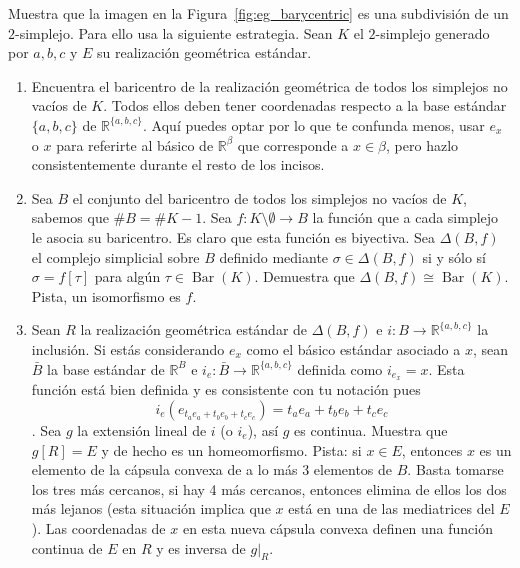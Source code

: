 \documentclass{standalone}
\begin{document}
	\begin{exercise}
		Muestra que la imagen en la Figura~\ref{fig:eg_barycentric} es una subdivisión de un $2$-simplejo. Para ello usa la siguiente estrategia. Sean $K$ el $2$-simplejo generado por ${a,b,c}$ y $E$ su realización geométrica estándar.
		
		\begin{enumerate}
			\item Encuentra el baricentro de la realización geométrica de todos los simplejos no vacíos de $K$. Todos ellos deben tener coordenadas respecto a la base estándar $\{a,b,c\}$ de $\mathbb{R}^{\{a,b,c\}}$. Aquí puedes optar por lo que te confunda menos, usar $e_{x}$ o $x$ para referirte al básico de $\mathbb{R}^{\beta}$ que corresponde a $x\in\beta$, pero hazlo consistentemente durante el resto de los incisos.
			
			\item Sea $B$ el conjunto del baricentro de todos los simplejos no vacíos de $K$, sabemos que $\#B = \#K -1$. Sea $f\colon K\setminus\emptyset \rightarrow B$ la función que a cada simplejo le asocia su baricentro. Es claro que esta función es biyectiva. Sea $\Delta(B,f)$ el complejo simplicial sobre $B$ definido mediante $\sigma\in\Delta(B,f)$ si y sólo sí $\sigma = f[\tau]$ para algún $\tau\in\operatorname{Bar}(K)$. Demuestra que $\Delta(B,f)\cong \operatorname{Bar}(K)$. Pista, un isomorfismo es $f$.
			
			\item Sean $R$ la realización geométrica estándar de $\Delta(B,f)$ e $i\colon B\rightarrow \mathbb{R}^{\{a,b,c\}}$ la inclusión. Si estás considerando $e_{x}$ como el básico estándar asociado a $x$, sean $\bar{B}$ la base estándar de $\mathbb{R}^{B}$ e $i_{e}\colon \bar{B} \rightarrow\mathbb{R}^{\{a,b,c\}}$ definida como $i_{e_{x}}=x$. Esta función está bien definida y es consistente con tu notación pues 
			\[
			i_{e}(e_{t_{a}e_{a}+t_{b}e_{b}+t_{c}e_{c}}) = t_{a}e_{a}+t_{b}e_{b}+t_{c}e_{c}
			\]. Sea $g$ la extensión lineal de $i$ (o $i_{e}$), así $g$ es continua. Muestra que $g[R] = E$ y de hecho es un homeomorfismo. Pista: si $x\in E$, entonces $x$ es un elemento de la cápsula convexa de a lo más 3 elementos de $B$. Basta tomarse los tres más cercanos, si hay 4 más cercanos, entonces elimina de ellos los dos más lejanos (esta situación implica que $x$ está en una de las mediatrices del $E$). Las coordenadas de $x$ en esta nueva cápsula convexa definen una función continua de $E$ en $R$ y es inversa de $g\vert_{R}$.
			

\end{enumerate}
\end{exercise}
\end{document}
